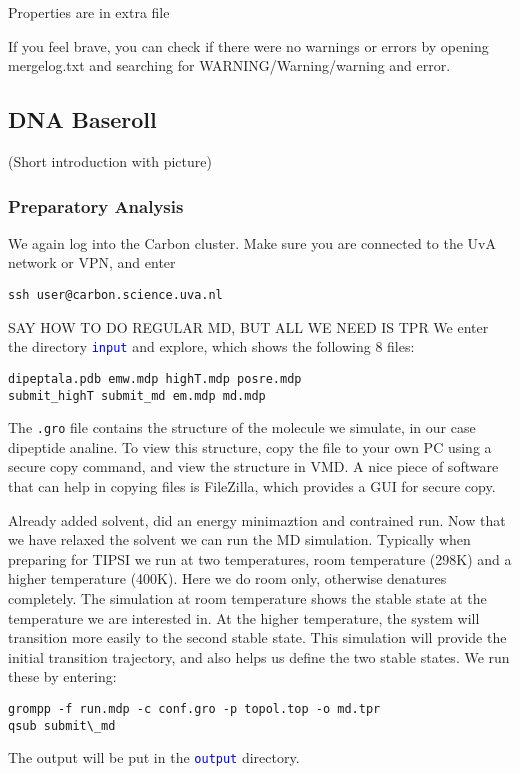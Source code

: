 \documentclass[]{article}
\begin{document}
Properties are in extra file

If you feel brave, you can check if there were no warnings or errors by opening mergelog.txt and searching for WARNING/Warning/warning and error. 



\newpage

\subsection*{DNA Baseroll}

(Short introduction with picture)

\subsubsection*{Preparatory Analysis}

We again log into the Carbon cluster. Make sure you are connected to the UvA network or VPN, and enter
%
\begin{lstlisting}
ssh user@carbon.science.uva.nl
\end{lstlisting}
%

SAY HOW TO DO REGULAR MD, BUT ALL WE NEED IS TPR
We enter the directory \texttt{\textcolor{blue}{input}} and explore, which shows the following 8 files:
%
\begin{lstlisting}
dipeptala.pdb emw.mdp highT.mdp posre.mdp 
submit_highT submit_md em.mdp md.mdp
\end{lstlisting}
%
The \texttt{.gro} file contains the structure of the molecule we simulate, in our case dipeptide analine. To view this structure, copy the file to your own PC using a secure copy command, and view the structure in VMD. A nice piece of software that can help in copying files is FileZilla, which provides a GUI for secure copy.

Already added solvent, did an energy minimaztion and contrained run. Now that we have relaxed the solvent we can run the MD simulation. Typically when preparing for \textsc{TIPSI} we run at two temperatures, room temperature (298K) and a higher temperature (400K). Here we do room only, otherwise denatures completely. The simulation at room temperature shows the stable state at the temperature we are interested in. At the higher temperature, the system will transition more easily to the second stable state. This simulation will provide the initial transition trajectory, and also helps us define the two stable states. We run these by entering:
%
\begin{lstlisting}
grompp -f run.mdp -c conf.gro -p topol.top -o md.tpr
qsub submit\_md
\end{lstlisting}
%
The output will be put in the \texttt{\textcolor{blue}{output}} directory.
\end{document}
